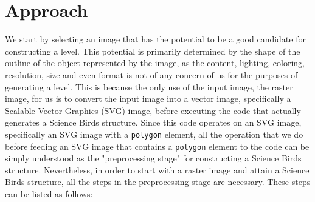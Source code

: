 \documentclass[12pt]{dalthesis}
\begin{document}
\author{Utku Gultopu}
\mcs

\mainmatter

\chapter{Approach}

We start by selecting an image that has the potential to be a good candidate for constructing a level. This potential is primarily determined by the shape of the outline of the object represented by the image, as the content, lighting, coloring, resolution, size and even format is not of any concern of us for the purposes of generating a level. This is because the only use of the input image, the raster image, for us is to convert the input image into a vector image, specifically a Scalable Vector Graphics (SVG) image, before executing the code that actually generates a Science Birds structure. Since this code operates on an SVG image, specifically an SVG image with a \lstinline{polygon} element, all the operation that we do before feeding an SVG image that contains a \lstinline{polygon} element to the code can be simply understood as the "preprocessing stage" for constructing a Science Birds structure. Nevertheless, in order to start with a raster image and attain a Science Birds structure, all the steps in the preprocessing stage are necessary. These steps can be listed as follows:
\end{document}
